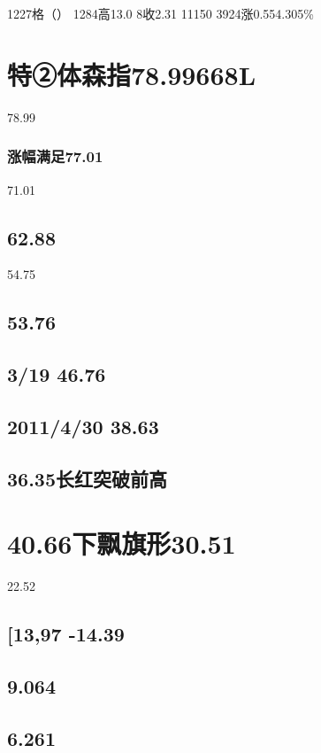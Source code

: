 \documentclass{article}
\begin{document}
1227格（） 1284高13.0 8收2.31 11150 3924涨0.554.305\%

\section{特②体森指78.99668L}

78.99

\subsubsection{涨幅满足77.01}

71.01

\subsection{62.88}

54.75

\subsection{53.76}

\subsection{3/19 46.76}

\subsection{2011/4/30 38.63}

\subsection{36.35长红突破前高}

\section{40.66下飘旗形30.51}

22.52

\subsection{[13,97 -14.39}

\subsection{9.064}

\subsection{6.261}
\end{document}
